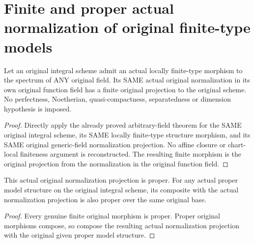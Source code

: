 \section{Finite and proper actual normalization of original finite-type models}

\begin{theorem}
\label{thm:actual-finite-type-scheme-normalization-finite}
\leanok
{}
Let an original integral scheme admit an actual locally finite-type
morphism to the spectrum of ANY original field. Its SAME actual
original normalization in its own original function field has a
finite original projection to the original scheme. No perfectness,
Noetherian, quasi-compactness, separatedness or dimension hypothesis
is imposed.
\end{theorem}
\begin{proof}
Directly apply the already proved arbitrary-field theorem for the
SAME original integral scheme, its SAME locally finite-type structure
morphism, and its SAME original generic-field normalization projection.
No affine closure or chart-local finiteness argument is reconstructed.
The resulting finite morphism is the original projection from the
normalization in the original function field.
\end{proof}

\begin{corollary}
\label{cor:actual-finite-type-scheme-normalization-proper}
\leanok
{}
This actual original normalization projection is proper. For any
actual proper model structure on the original integral scheme,
its composite with the actual normalization projection is also
proper over the same original base.
\end{corollary}
\begin{proof}
Every genuine finite original morphism is proper. Proper original
morphisms compose, so compose the resulting actual normalization
projection with the original given proper model structure.
\end{proof}
